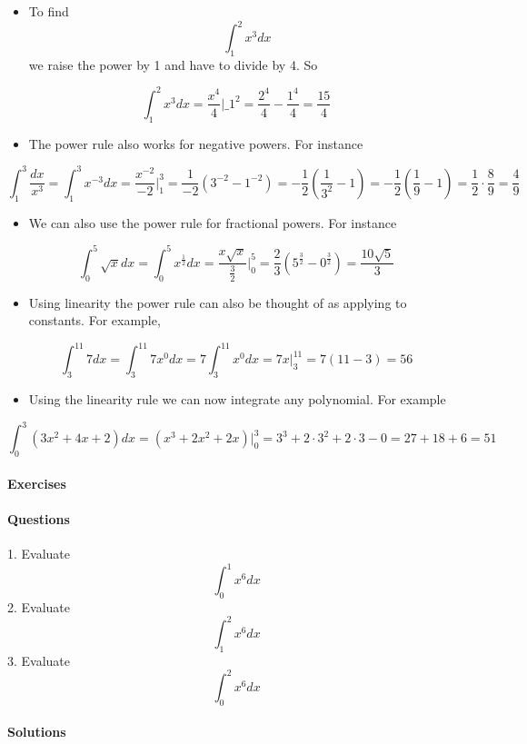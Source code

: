 \begin{itemize}
    \item To find $$\int_1^2x^3dx$$ we raise the power by 1 and have to divide by 4. So
\end{itemize}
  $$\int_1^2x^3dx=\frac{x^4}{4}\Bigg|\_1^2=\frac{2^4}{4}-\frac{1^4}{4}=\frac{15}{4}$$

\begin{itemize}
    \item The power rule also works for negative powers. For instance
\end{itemize}
  $$\int_1^3\frac{dx}{x^3}=\int_1^3x^{-3}dx=\frac{x^{-2}}{-2}\Bigg|_1^3=\frac{1}{-2}\left(3^{-2}-1^{-2}\right)=-\frac12\left(\frac{1}{3^2}-1\right)=-\frac12\left(\frac19-1\right)=\frac12\cdot\frac89=\frac49$$

\begin{itemize}
    \item We can also use the power rule for fractional powers. For instance
\end{itemize}
  $$\int_0^5\sqrt{x}dx=\int_0^5x^\frac12dx=\frac{x\sqrt{x}}{\frac32}\Bigg|_0^5=\frac23\left(5^\frac32-0^\frac32\right)=\frac{10\sqrt5}{3}$$

\begin{itemize}
    \item Using linearity the power rule can also be thought of as applying to constants. For example,
\end{itemize}
  $$\int_3^{11}7dx=\int_3^{11}7x^0dx=7\int_3^{11}x^0dx=7x\Bigg|_3^{11}=7(11-3)=56$$

\begin{itemize}
    \item Using the linearity rule we can now integrate any polynomial. For example
\end{itemize}
  $$\int_0^3(3x^2+4x+2)dx=(x^3+2x^2+2x)\Bigg|_0^3=3^3+2\cdot 3^2+2\cdot3-0=27+18+6=51$$

\paragraph{Exercises}

\paragraph{Questions}

1. Evaluate $$\int_0^1x^6dx$$
2. Evaluate $$\int_1^2x^6dx$$
3. Evaluate $$\int_0^2x^6dx$$

\paragraph{Solutions}

